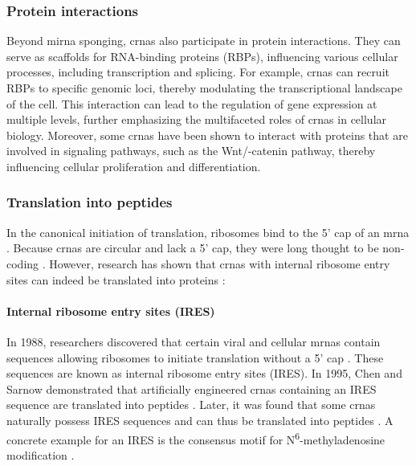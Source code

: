 \subsubsection{Protein interactions}
Beyond \gls{mirna} sponging, \glspl{crna} also participate in protein
interactions.
They can serve as scaffolds for RNA-binding proteins (RBPs), influencing
various cellular processes, including transcription and
splicing\supercite{li_comprehensive_2017,qu_emerging_2017}.
For example, \glspl{crna} can recruit RBPs to specific genomic loci, thereby
modulating the transcriptional landscape of the
cell\supercite{li_comprehensive_2017}.
This interaction can lead to the regulation of gene expression at multiple
levels, further emphasizing the multifaceted roles of \glspl{crna} in cellular
biology\supercite{zhang_important_2024,he_targeting_2021}.
Moreover, some \glspl{crna} have been shown to interact with proteins that are
involved in signaling pathways, such as the Wnt/\textbeta{}-catenin pathway,
thereby influencing cellular proliferation and
differentiation\supercite{peng_novel_2021}.

\subsubsection{Translation into peptides}
In the canonical initiation of translation, ribosomes bind to the 5' cap of an
\gls{mrna} \supercite{hinnebusch_mechanism_2012}.
Because \glspl{crna} are circular and lack a 5' cap, they were long thought to
be non-coding \supercite{bao_regulatory_2019,greene_circular_2017}.
However, research has shown that \glspl{crna} with internal ribosome entry
sites can indeed be translated into proteins \supercite{chen_expanding_2020}:

\paragraph{Internal ribosome entry sites (IRES)} In 1988, researchers
discovered that certain viral and cellular \glspl{mrna} contain sequences
allowing ribosomes to initiate translation without a 5' cap
\supercite{pelletier_internal_1988, jang_segment_1988}.
These sequences are known as internal ribosome entry sites (IRES).
In 1995, Chen and Sarnow demonstrated that artificially engineered \glspl{crna}
containing an IRES sequence are translated into peptides
\supercite{chen_initiation_1995}.
Later, it was found that some \glspl{crna} naturally possess IRES sequences and
can thus be translated into peptides
\supercite{chen_expanding_2020,legnini_circ-znf609_2017,pamudurti_translation_2017}.
A concrete example for an IRES is the consensus motif for
N\textsuperscript{6}-methyladenosine modification
\supercite{yang_extensive_2017}.


